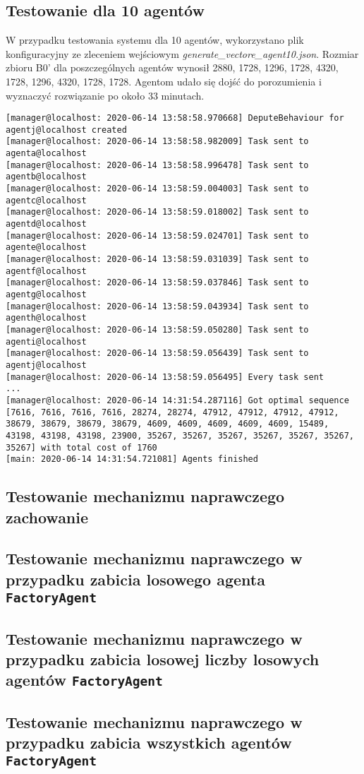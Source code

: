 \subsection{Testowanie dla 10 agentów}
W przypadku testowania systemu dla 10 agentów, wykorzystano plik konfiguracyjny ze zleceniem wejściowym \textit{generate\_vectore\_agent10.json}. Rozmiar zbioru B0' dla poszczególnych agentów wynosił 2880, 1728, 1296, 1728, 4320, 1728, 1296, 4320, 1728, 1728. Agentom udało się dojść do porozumienia i wyznaczyć rozwiązanie po około 33 minutach.
\begin{lstlisting}
[manager@localhost: 2020-06-14 13:58:58.970668] DeputeBehaviour for agentj@localhost created
[manager@localhost: 2020-06-14 13:58:58.982009] Task sent to agenta@localhost
[manager@localhost: 2020-06-14 13:58:58.996478] Task sent to agentb@localhost
[manager@localhost: 2020-06-14 13:58:59.004003] Task sent to agentc@localhost
[manager@localhost: 2020-06-14 13:58:59.018002] Task sent to agentd@localhost
[manager@localhost: 2020-06-14 13:58:59.024701] Task sent to agente@localhost
[manager@localhost: 2020-06-14 13:58:59.031039] Task sent to agentf@localhost
[manager@localhost: 2020-06-14 13:58:59.037846] Task sent to agentg@localhost
[manager@localhost: 2020-06-14 13:58:59.043934] Task sent to agenth@localhost
[manager@localhost: 2020-06-14 13:58:59.050280] Task sent to agenti@localhost
[manager@localhost: 2020-06-14 13:58:59.056439] Task sent to agentj@localhost
[manager@localhost: 2020-06-14 13:58:59.056495] Every task sent
...
[manager@localhost: 2020-06-14 14:31:54.287116] Got optimal sequence [7616, 7616, 7616, 7616, 28274, 28274, 47912, 47912, 47912, 47912, 38679, 38679, 38679, 38679, 4609, 4609, 4609, 4609, 4609, 15489, 43198, 43198, 43198, 23900, 35267, 35267, 35267, 35267, 35267, 35267, 35267] with total cost of 1760
[main: 2020-06-14 14:31:54.721081] Agents finished
\end{lstlisting}
\subsection{Testowanie mechanizmu naprawczego zachowanie}

\subsection{Testowanie mechanizmu naprawczego w przypadku zabicia losowego agenta \texttt{FactoryAgent}}

\subsection{Testowanie mechanizmu naprawczego w przypadku zabicia losowej liczby losowych agentów \texttt{FactoryAgent}}

\subsection{Testowanie mechanizmu naprawczego w przypadku zabicia wszystkich agentów \texttt{FactoryAgent}}